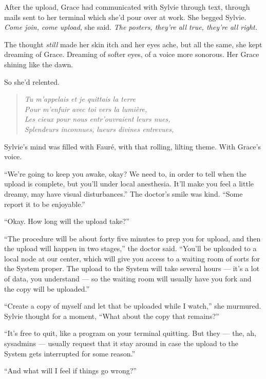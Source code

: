\documentclass[12pt,letterpaper,oneside]{memoir}
\begin{document}
  After the upload, Grace had communicated with Sylvie through text,
  through mails sent to her terminal which she'd pour over at work. She
  begged Sylvie. \emph{Come join, come upload,} she said. \emph{The
  posters, they're all true, they're all right.}

  The thought \emph{still} made her skin itch and her eyes ache, but all
  the same, she kept dreaming of Grace. Dreaming of softer eyes, of a
  voice more sonorous. Her Grace shining like the dawn.

  So she'd relented.

  \begin{quote}
  \emph{Tu m'appelais et je quittais la terre\\
  Pour m'enfuir avec toi vers la lumi\`{e}re,\\
  Les cieux pour nous entr'ouvraient leurs nues,\\
  Splendeurs inconnues, lueurs divines entrevues,}
  \end{quote}

  Sylvie's mind was filled with Faur\'{e}, with that rolling, lilting theme.
  With Grace's voice.

  ``We're going to keep you awake, okay? We need to, in order to tell when
  the upload is complete, but you'll under local anesthesia. It'll make
  you feel a little dreamy, may have visual disturbances.'' The doctor's
  smile was kind. ``Some report it to be enjoyable.''

  ``Okay. How long will the upload take?''

  ``The procedure will be about forty five minutes to prep you for upload,
  and then the upload will happen in two stages,'' the doctor said.
  ``You'll be uploaded to a local node at our center, which will give you
  access to a waiting room of sorts for the System proper. The upload to
  the System will take several hours --- it's a lot of data, you
  understand --- so the waiting room will usually have you fork and the
  copy will be uploaded.''

  ``Create a copy of myself and let that be uploaded while I watch,'' she
  murmured. Sylvie thought for a moment, ``What about the copy that
  remains?''

  ``It's free to quit, like a program on your terminal quitting. But they
  --- the, ah, sysadmins --- usually request that it stay around in case
  the upload to the System gets interrupted for some reason.''

  ``And what will I feel if things go wrong?''
\end{document}
